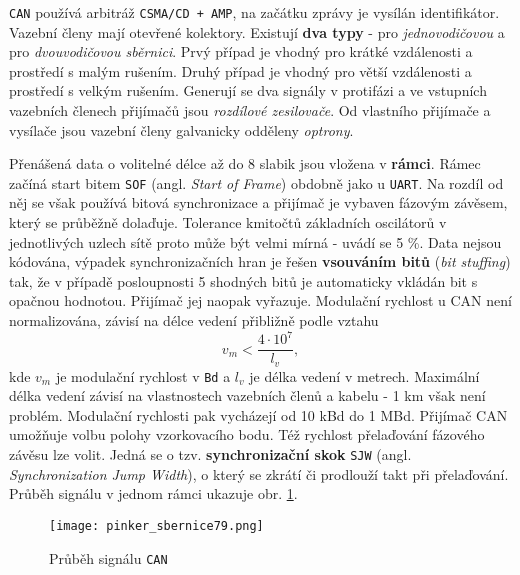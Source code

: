         \texttt{CAN} používá arbitráž \texttt{CSMA/CD + AMP}, na začátku zprávy je vysílán 
        identifikátor. Vazební členy mají otevřené kolektory. Existují \textbf{dva typy} - pro 
        \emph{jednovodičovou} a pro \emph{dvouvodičovou sběrnici}. Prvý případ je vhodný pro krátké 
        vzdálenosti a prostředí s malým rušením. Druhý případ je vhodný pro větší vzdálenosti a 
        prostředí s velkým rušením. Generují se dva signály v protifázi a ve vstupních vazebních 
        členech přijímačů jsou \emph{rozdílové zesilovače}. Od vlastního přijímače a vysílače jsou 
        vazební členy galvanicky odděleny \emph{optrony}.
        
        Přenášená data o volitelné délce až do 8 slabik jsou vložena v \textbf{rámci}. Rámec začíná 
        start bitem \texttt{SOF} (angl. \emph{Start of Frame}) obdobně jako u \texttt{UART}. Na 
        rozdíl od něj se však používá bitová synchronizace a přijímač je vybaven fázovým závěsem, 
        který se průběžně dolaďuje. Tolerance kmitočtů základních oscilátorů v jednotlivých uzlech 
        sítě proto může být velmi mírná - uvádí se 5 \%. Data nejsou kódována, výpadek 
        synchronizačních hran je řešen \textbf{vsouváním bitů} (\emph{bit stuffing}) tak, že v 
        případě posloupnosti 5 shodných bitů je automaticky vkládán bit s opačnou hodnotou. 
        Přijímač jej naopak vyřazuje. Modulační rychlost u CAN není normalizována, závisí 
        na délce vedení přibližně podle vztahu
        \begin{equation*}
          v_m < \frac{4\cdot10^7}{l_v},
        \end{equation*}
        kde \(v_m\) je modulační rychlost v \texttt{Bd} a \(l_v\) je délka vedení v metrech. 
        Maximální délka vedení závisí na vlastnostech vazebních členů a kabelu - 1 km však není 
        problém. Modulační rychlosti pak vycházejí od 10 kBd do 1 MBd. Přijímač CAN umožňuje volbu 
        polohy vzorkovacího bodu. Též rychlost přelaďování fázového závěsu lze volit. Jedná se o 
        tzv. \textbf{synchronizační skok} \texttt{SJW} (angl. \emph{Synchronization Jump Width}), o 
        který se zkrátí či prodlouží takt při přelaďování. Průběh signálu v jednom rámci ukazuje 
        obr. \ref{MIT:fig_sbernice79}.        

        \begin{figure}[ht!] %
          \centering
          \texttt{[image: pinker\_sbernice79.png]}
          \caption{Průběh signálu \texttt{CAN}}
          \label{MIT:fig_sbernice79}
        \end{figure}
        
